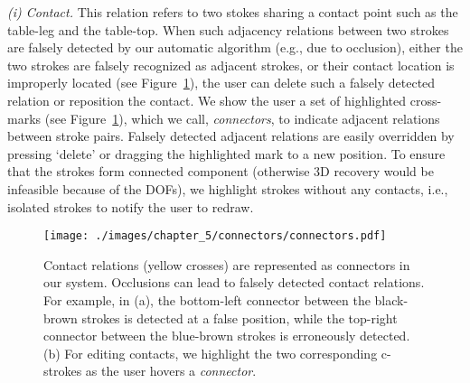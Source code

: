 \emph{(i) Contact.} This relation refers to two stokes sharing a contact point such as the table-leg and the table-top. When such adjacency  relations between two strokes are falsely detected by our automatic algorithm (e.g., due to occlusion), either the two strokes are falsely recognized as adjacent strokes, or their contact location is improperly located (see Figure~\ref{fig:connectors}), the user can delete such a falsely detected relation or reposition the contact. We show the user a set of highlighted cross-marks (see Figure~\ref{fig:connectors}), which we call, \emph{connectors}, to indicate adjacent relations between stroke pairs. Falsely detected adjacent relations are easily overridden by pressing `delete' or dragging the highlighted mark to a new position. To ensure that the strokes form connected component (otherwise 3{D} recovery would be infeasible because of the DOFs), we highlight strokes without any contacts, i.e., isolated strokes to notify the user to redraw.

\begin{figure}[b!]
  \vnudge
  \texttt{[image: ./images/chapter\_5/connectors/connectors.pdf]}
  \caption{ Contact relations (yellow crosses) are represented as connectors in our system. Occlusions can lead to falsely detected contact relations. For example, in (a), the bottom-left connector between the black-brown strokes is detected at a false position, while the top-right connector between the blue-brown strokes is erroneously detected.  (b) For editing contacts, we highlight the two corresponding c-strokes as the user hovers a \emph{connector}.}
  \label{fig:connectors}
\end{figure}


